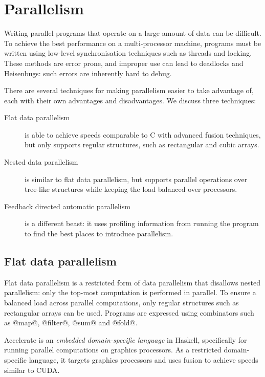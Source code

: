 \section{Parallelism}
Writing parallel programs that operate on a large amount of data can be difficult.
To achieve the best performance on a multi-processor machine, programs must be written using low-level synchronisation techniques such as threads and locking.
These methods are error prone, and improper use can lead to deadlocks and Heisenbugs: such errors are inherently hard to debug.

There are several techniques for making parallelism easier to take advantage of,
each with their own advantages and disadvantages.
We discuss three techniques:

\begin{description}
\item[Flat   data parallelism]
is able to achieve speeds comparable to C with advanced fusion techniques,
but only supports regular structures, such as rectangular and cubic arrays.

\item[Nested data parallelism]
is similar to flat data parallelism,
but supports parallel operations over tree-like structures
while keeping the load balanced over processors.

\item[Feedback directed automatic parallelism]
is a different beast: it uses profiling information from running the program
to find the best places to introduce parallelism. 
\end{description}


\subsection{Flat data parallelism}
Flat data parallelism is a restricted form of data parallelism that disallows nested parallelism:
only the top-most computation is performed in parallel.
To ensure a balanced load across parallel computations, only regular structures such as rectangular arrays can be used.
Programs are expressed using combinators such as @map@, @filter@, @sum@ and @fold@.

Accelerate is an \emph{embedded domain-specific language} in Haskell, specifically for running parallel computations on graphics processors.
As a restricted domain-specific language, it targets graphics processors\cite{chakravarty2011accelerating} and uses fusion to achieve speeds similar to CUDA\cite{mcdonell2013optimising}.

